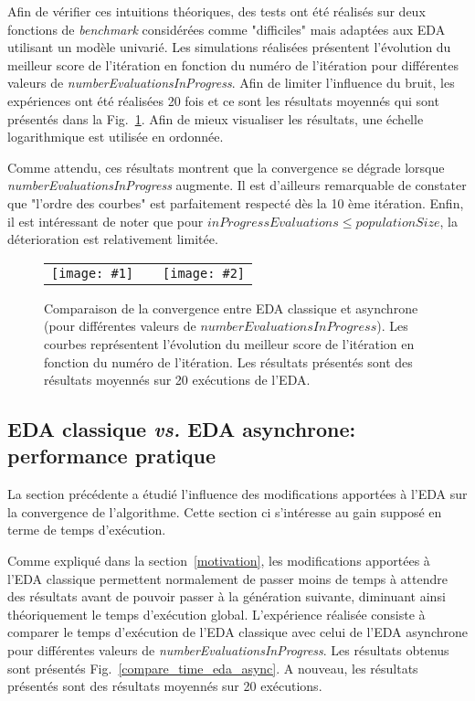 \documentclass[a4paper, 12pt]{report}
\newcommand{\twocurves}[2]{
 \begin{tabular}{lcr}
  \hspace{-30pt} 
  \texttt{[image: \#1]} 
  & \hspace{-65pt} & 
  \texttt{[image: \#2]} \\
 \end{tabular}
 \vspace{-10pt}
}
\begin{document}
Afin de vérifier ces intuitions théoriques, des tests ont été réalisés sur deux fonctions de \textit{benchmark} considérées comme "difficiles" mais adaptées aux EDA utilisant un modèle univarié. Les simulations réalisées présentent l'évolution du meilleur score de l'itération en fonction du numéro de l'itération pour différentes valeurs de \textit{numberEvaluationsInProgress}. Afin de limiter l'influence du bruit, les expériences ont été réalisées 20 fois et ce sont les résultats moyennés qui sont présentés dans la Fig.~\ref{compare_eda_async}. Afin de mieux visualiser les résultats, une échelle logarithmique est utilisée en ordonnée.

Comme attendu, ces résultats montrent que la convergence se dégrade lorsque \textit{number\-EvaluationsInProgress} augmente. Il est d'ailleurs remarquable de constater que "l'ordre des courbes" est parfaitement respecté dès la 10 ème itération. Enfin, il est intéressant de noter que pour  $inProgressEvaluations \leq populationSize$, la déterioration est relativement limitée.


\begin{figure}[!b]
\twocurves{./data/compare_eda_async_f13.pdf}{./data/compare_eda_async_f14.pdf}
\caption{Comparaison de la convergence entre EDA classique et asynchrone (pour différentes valeurs de $numberEvaluationsInProgress$). Les courbes représentent l'évolution du meilleur score de l'itération en fonction du numéro de l'itération. Les résultats présentés sont des résultats moyennés sur 20 exécutions de l'EDA.}
\label{compare_eda_async}
\end{figure}

\subsection{EDA classique \textit{vs.} EDA asynchrone: performance pratique}
\label{edavsasynctime}
La section précédente a étudié l'influence des modifications apportées à l'EDA sur la convergence de l'algorithme. Cette section ci s'intéresse au gain supposé en terme de temps d'exécution.

Comme expliqué dans la section~\ref{motivation}, les modifications apportées à l'EDA classique permettent normalement de passer moins de temps à attendre des résultats avant de pouvoir passer à la génération suivante, diminuant ainsi théoriquement le temps d'exécution global. L'expérience réalisée consiste à comparer le temps d'exécution de l'EDA classique avec celui de l'EDA asynchrone pour différentes valeurs de \textit{numberEvaluationsInProgress}. Les résultats obtenus sont présentés Fig.~\ref{compare_time_eda_async}. A nouveau, les résultats présentés sont des résultats moyennés sur 20 exécutions.
\end{document}
